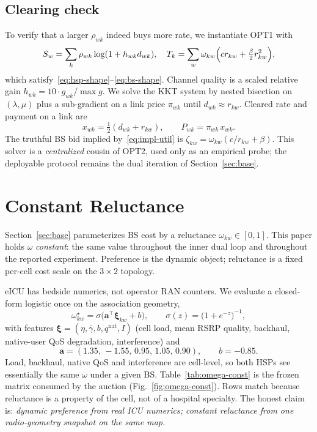 \documentclass[journal,a4paper,10pt]{IEEEtran}
\begin{document}
\subsection{Clearing check}
To verify that a larger \(\rho_{wk}\) indeed buys more rate, we instantiate OPT1 with
\begin{equation}
  S_w=\sum_k \rho_{wk}\log(1+h_{wk}d_{wk}),
  \quad
  T_k=\sum_w \omega_{kw}\Bigl(c r_{kw}+\tfrac{\beta}{2}r_{kw}^2\Bigr),
  \label{eq:impl-util}
\end{equation}
which satisfy~\eqref{eq:hsp-shape}--\eqref{eq:bs-shape}. Channel quality is a scaled relative gain \(h_{wk}=10\cdot g_{wk}/\max g\). We solve the KKT system by nested bisection on \((\lambda,\mu)\) plus a sub-gradient on a link price \(\pi_{wk}\) until \(d_{wk}\approx r_{kw}\). Cleared rate and payment on a link are
\begin{equation}
  x_{wk}=\tfrac12(d_{wk}+r_{kw}),\qquad
  P_{wk}=\pi_{wk}\,x_{wk}.
  \label{eq:x-pay}
\end{equation}
The truthful BS bid implied by~\eqref{eq:impl-util} is \(\zeta_{kw}=\omega_{kw}(c/r_{kw}+\beta)\). This solver is a \emph{centralized} cousin of OPT2, used only as an empirical probe; the deployable protocol remains the dual iteration of Section~\ref{sec:base}.

\section{Constant Reluctance}
\label{sec:omega-impl}

Section~\ref{sec:base} parameterizes BS cost by a reluctance \(\omega_{kw}\in[0,1]\). This paper holds \(\omega\) \emph{constant}: the same value throughout the inner dual loop and throughout the reported experiment. Preference is the dynamic object; reluctance is a fixed per-cell cost scale on the \(3\times 2\) topology.

eICU has bedside numerics, not operator RAN counters. We evaluate a closed-form logistic once on the association geometry,
\begin{equation}
  \omega_{kw}^{\star}
  =\sigma\bigl(\mathbf{a}^\top\boldsymbol{\xi}_{kw}+b\bigr),\qquad
  \sigma(z)=\bigl(1+e^{-z}\bigr)^{-1},
  \label{eq:omega-star}
\end{equation}
with features \(\boldsymbol{\xi}=(\eta,\bar\gamma,b,q^{\mathrm{nat}},I)\) (cell load, mean RSRP quality, backhaul, native-user QoS degradation, interference) and
\begin{equation}
  \mathbf{a}=(1.35,\,-1.55,\,0.95,\,1.05,\,0.90),\qquad b=-0.85.
  \label{eq:omega-ab}
\end{equation}
Load, backhaul, native QoS and interference are cell-level, so both HSPs see essentially the same \(\omega\) under a given BS. Table~\ref{tab:omega-const} is the frozen matrix consumed by the auction (Fig.~\ref{fig:omega-const}). Rows match because reluctance is a property of the cell, not of a hospital specialty. The honest claim is: \emph{dynamic preference from real ICU numerics; constant reluctance from one radio-geometry snapshot on the same map.}
\end{document}
